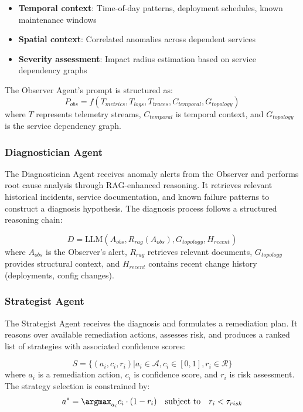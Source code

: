 \documentclass[journal]{IEEEtran}
\begin{document}
\begin{itemize}
    \item \textbf{Temporal context}: Time-of-day patterns, deployment schedules, known maintenance windows
    \item \textbf{Spatial context}: Correlated anomalies across dependent services
    \item \textbf{Severity assessment}: Impact radius estimation based on service dependency graphs
\end{itemize}

The Observer Agent's prompt is structured as:
\begin{equation}
P_{obs} = f(T_{metrics}, T_{logs}, T_{traces}, C_{temporal}, G_{topology})
\end{equation}
where $T$ represents telemetry streams, $C_{temporal}$ is temporal context, and $G_{topology}$ is the service dependency graph.

\subsubsection{Diagnostician Agent}
The Diagnostician Agent receives anomaly alerts from the Observer and performs root cause analysis through RAG-enhanced reasoning. It retrieves relevant historical incidents, service documentation, and known failure patterns to construct a diagnosis hypothesis. The diagnosis process follows a structured reasoning chain:

\begin{equation}
D = \text{LLM}(A_{obs}, R_{rag}(A_{obs}), G_{topology}, H_{recent})
\end{equation}
where $A_{obs}$ is the Observer's alert, $R_{rag}$ retrieves relevant documents, $G_{topology}$ provides structural context, and $H_{recent}$ contains recent change history (deployments, config changes).

\subsubsection{Strategist Agent}
The Strategist Agent receives the diagnosis and formulates a remediation plan. It reasons over available remediation actions, assesses risk, and produces a ranked list of strategies with associated confidence scores:

\begin{equation}
S = \{(a_i, c_i, r_i) | a_i \in \mathcal{A}, c_i \in [0,1], r_i \in \mathcal{R}\}
\end{equation}
where $a_i$ is a remediation action, $c_i$ is confidence score, and $r_i$ is risk assessment. The strategy selection is constrained by:
\begin{equation}
a^* = \argmax_{a_i} c_i \cdot (1 - r_i) \quad \text{subject to} \quad r_i < \tau_{risk}
\end{equation}
\end{document}
